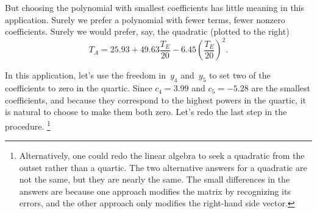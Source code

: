 \begin{example}
\begin{solution}
\begin{enumerate}
\begin{figbox}{}
But choosing the polynomial with smallest coefficients has little meaning in this application.
Surely we prefer a polynomial with fewer terms, fewer nonzero coefficients.
Surely we would prefer, say, the quadratic (plotted to the right)
\begin{equation*}
T_A=25.93+49.63\frac{T_E}{20} 
-6.45\left(\frac{T_E}{20}\right)^2.
\end{equation*}
\end{figbox}

In this application, let's use the freedom in~\(y_4\) and~\(y_5\) to set two of the coefficients to zero in the quartic.
Since \(c_4=3.99\) and \(c_5=-5.28\) are the smallest coefficients, and because they correspond to the highest powers in the quartic, it is natural to choose to make them both zero.
Let's redo the last step in the procedure.%
\footnote{Alternatively, one could redo the linear algebra to seek a quadratic from the outset rather than a quartic.  
The two alternative answers for a quadratic are not the same, but they are nearly the same.  
The small differences in the answers are because one approach modifies the matrix by recognizing its errors, and the other approach only modifies the right-hand side vector.}


\end{enumerate}
\end{solution}
\end{example}
